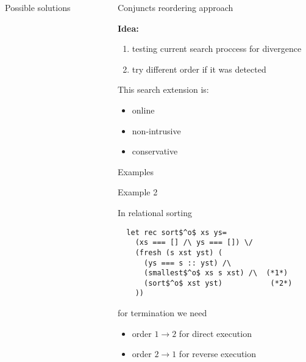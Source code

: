 \documentclass[final]{beamer}
\newlength{\sepwid}
\newlength{\onecolwid}
\begin{document}
\begin{frame}[fragile]
\begin{columns}[t]
\begin{column}{\onecolwid}
\begin{block}{Possible solutions}
\end{block}

\end{column} %


\begin{column}{\sepwid}\end{column} %


\begin{column}{\onecolwid} %

\begin{block}{Conjuncts reordering approach}

\textbf{Idea:} 

\begin{enumerate}
\item testing current search proccess for divergence
\item try different order if it was detected
\end{enumerate}

This search extension is:

\begin{itemize}
  \item online
  \item non-intrusive
  \item conservative
\end{itemize}

\end{block}

\begin{block}{Examples}

\begin{alertblock}{Example 2}

In relational sorting

\begin{lstlisting}
  let rec sort$^o$ xs ys=
    (xs === [] /\ ys === []) \/
    (fresh (s xst yst) (
      (ys === s :: yst) /\
      (smallest$^o$ xs s xst) /\  (*1*)
      (sort$^o$ xst yst)           (*2*)
    ))
\end{lstlisting}

for termination we need

\begin{itemize}
\item order $1 \to 2$ for direct execution
\item order $2 \to 1$ for reverse execution
\end{itemize}

\bigskip


\end{alertblock}
\end{block}
\end{column}
\end{columns}
\end{frame}
\end{document}
